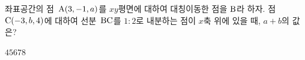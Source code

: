좌표공간의 점~$\mathrm{A}(3{,}\mkern3mu\mathopen{}-1{,}\mkern3mu\mathopen{}a)$를 $xy$평면에 대하여 대칭이동한 점을 $\mathrm{B}$라 하자. 점~$\mathrm{C}(-3{,}\mkern3mu\mathopen{}b{,}\mkern3mu\mathopen{}4)$에 대하여 선분~$\mathrm{BC}$를 $1:2$로 내분하는 점이 $x$축 위에 있을 때, $a+b$의 값은?
\begin{choices32}{$4$}{$5$}{$6$}{$7$}{$8$}\end{choices32}
